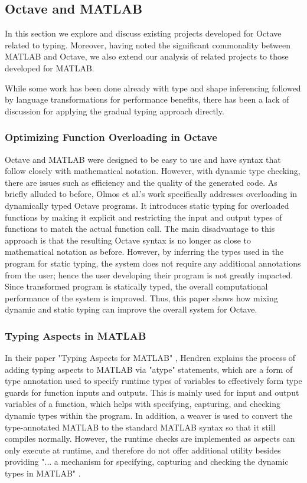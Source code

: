 \subsection{Octave and MATLAB}
 In this section we explore and discuss existing projects developed for Octave related to typing. Moreover, having noted the significant commonality between MATLAB and Octave, we also extend our analysis of related projects to those developed for MATLAB.
 
 While some work has been done already with type and shape inferencing followed by language transformations for performance benefits, there has been a lack of discussion for applying the gradual typing approach directly.

\subsubsection{Optimizing Function Overloading in Octave}
Octave and MATLAB were designed to be easy to use and have syntax that follow closely with mathematical notation. However, with dynamic type checking, there are issues such as efficiency and the quality of the generated code. As briefly alluded to before, Olmos et al.'s work \cite{olmos2003turning} specifically addresses overloading in dynamically typed Octave programs. It introduces static typing for overloaded functions by making it explicit and restricting the input and output types of functions to match the actual function call. The main disadvantage to this approach is that the resulting Octave syntax is no longer as close to mathematical notation as before. However, by inferring the types used in the program for static typing, the system does not require any additional annotations from the user; hence the user developing their program is not greatly impacted. Since transformed program is statically typed, the overall computational performance of the system is improved. Thus, this paper shows how mixing dynamic and static typing can improve the overall system for Octave.

\subsubsection{Typing Aspects in MATLAB}
 In their paper "Typing Aspects for MATLAB" \cite{hendren2011typing}, Hendren explains the process of adding typing aspects to MATLAB via "atype" statements, which are a form of type annotation used to specify runtime types of variables to effectively form type guards for function inputs and outputs. This is mainly used for input and output variables of a function, which helps with specifying, capturing, and checking dynamic types within the program. In addition, a weaver is used to convert the type-annotated MATLAB to the standard MATLAB syntax so that it still compiles normally. However, the runtime checks are implemented as aspects can only execute at runtime, and therefore do not offer additional utility besides providing "... a mechanism for specifying, capturing and checking the dynamic types in MATLAB" \cite{hendren2011typing}.


